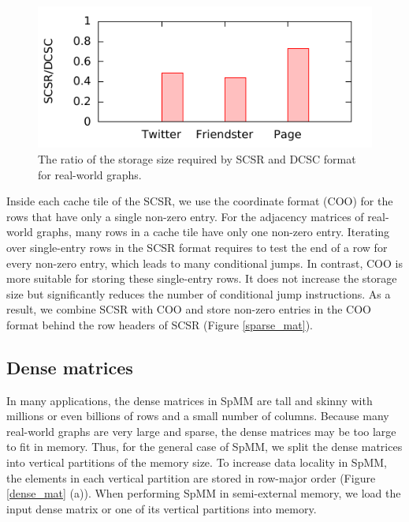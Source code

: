 \begin{figure}
	\begin{center}
		\footnotesize
		\includegraphics[scale=1]{SpMM_figs/storage.pdf}
		\caption{The ratio of the storage size required by SCSR and DCSC
		\cite{Buluc08} format for real-world graphs.}
		\label{fig:storage}
	\end{center}
\end{figure}

Inside each cache tile of the SCSR, we use the coordinate format (COO) for
the rows that have only a single non-zero entry. For the adjacency matrices of
real-world graphs, many rows in a cache tile have only one non-zero entry.
Iterating over single-entry rows in the SCSR format requires to test
the end of a row for every non-zero entry, which leads to many conditional jumps.
In contrast, COO is more suitable for storing these
single-entry rows. It does not increase the storage size but significantly
reduces the number of conditional jump instructions. As a result, we combine
SCSR with COO and store non-zero entries in the COO format behind the row headers
of SCSR (Figure \ref{sparse_mat}).


\subsection{Dense matrices}
In many applications, the dense matrices in SpMM are tall and skinny with
millions or even billions of rows and a small number of columns.
Because many real-world graphs
are very large and sparse, the dense matrices may be too large to fit in memory.
Thus, for the general case of SpMM, we split the dense matrices into vertical
partitions of the memory size. To increase data locality in SpMM, the elements
in each vertical partition are stored in row-major order (Figure \ref{dense_mat}
(a)).  When performing SpMM in semi-external memory, we load the input dense
matrix or one of its vertical partitions into memory. 

